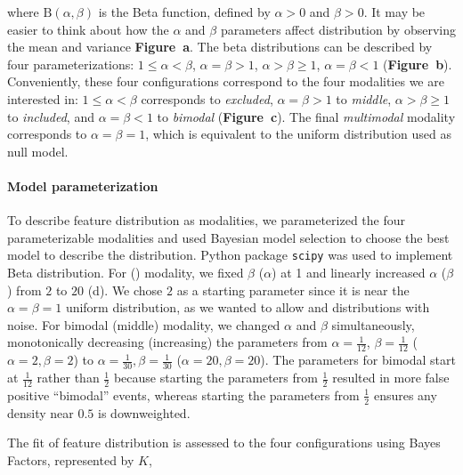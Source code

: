 where $\mathrm{B}\left(\alpha, \beta\right)$ is the Beta function, defined by $\alpha > 0$ and $\beta > 0$. It may be easier to think about how the $\alpha$ and $\beta$ parameters affect distribution by observing the mean and variance \textbf{Figure~a}. The beta distributions can be described by four parameterizations: $1 \leq \alpha < \beta$, $\alpha = \beta > 1$, $\alpha > \beta \geq 1$, $\alpha = \beta < 1$ (\textbf{Figure~b}). Conveniently, these four configurations correspond to the four modalities we are interested in: $1 \leq \alpha < \beta$ corresponds to \emph{excluded}, $\alpha = \beta > 1$ to \emph{middle}, $\alpha > \beta \geq 1$ to \emph{included}, and $\alpha = \beta < 1$ to \emph{bimodal} (\textbf{Figure~c}). The final \emph{multimodal} modality corresponds to $\alpha = \beta = 1$, which is equivalent to the uniform distribution used as null model.



\paragraph{Model parameterization}
To describe feature distribution as modalities, we parameterized the four parameterizable modalities and used Bayesian model selection to choose the best model to describe the distribution. Python package \texttt{scipy}\cite{Oliphant:2007dm,Millman:2011jv} was used to implement Beta distribution.
For \1 (\0) modality, we fixed $\beta$ ($\alpha$) at 1 and linearly increased $\alpha$ ($\beta$) from $2$ to $20$ (d). We chose $2$ as a starting parameter since it is near the $\alpha=\beta=1$ uniform distribution, as we wanted to allow \0 and \1 distributions with noise. For bimodal (middle) modality, we changed $\alpha$ and $\beta$ simultaneously, monotonically decreasing (increasing) the parameters from $\alpha=\frac{1}{12}$, $\beta = \frac{1}{12}$ ($\alpha = 2, \beta = 2$) to $\alpha = \frac{1}{30}, \beta = \frac{1}{30}$ ($\alpha = 20, \beta=20$). The parameters for bimodal start at $\frac{1}{12}$ rather than $\frac{1}{2}$ because starting the parameters from $\frac{1}{2}$ resulted in more false positive ``bimodal'' events, whereas starting the parameters from $\frac{1}{2}$ ensures any density near $0.5$ is downweighted.


The fit of feature distribution is assessed to the four configurations using Bayes Factors, represented by $K$,

